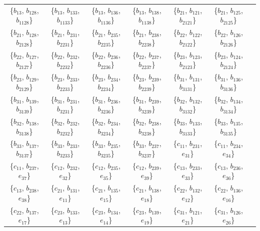 \documentclass[%
  reprint,
  superscriptaddress,
  showpacs,
  showkeys,
  amsmath,amssymb,
  pra,
  longbibliography,
  floatfix,
  x11names
]{revtex4-2}
\begin{document}
\begin{table}[htbp!]
\begin{ruledtabular}
\begin{tabular}{ccccccc}
\{$b_{13}$, $b_{128}$, $b_{1128}$\} & \{$b_{13}$, $b_{133}$, $b_{1133}$\} & \{$b_{13}$, $b_{136}$, $b_{1136}$\} & \{$b_{13}$, $b_{138}$, $b_{1138}$\} & \{$b_{21}$, $b_{121}$, $b_{2121}$\} & \{$b_{21}$, $b_{125}$, $b_{2125}$\} \\
\{$b_{21}$, $b_{128}$, $b_{2128}$\} & \{$b_{21}$, $b_{231}$, $b_{2231}$\} & \{$b_{21}$, $b_{235}$, $b_{2235}$\} & \{$b_{21}$, $b_{238}$, $b_{2238}$\} & \{$b_{22}$, $b_{122}$, $b_{2122}$\} & \{$b_{22}$, $b_{126}$, $b_{2126}$\} \\
\{$b_{22}$, $b_{127}$, $b_{2127}$\} & \{$b_{22}$, $b_{232}$, $b_{2232}$\} & \{$b_{22}$, $b_{236}$, $b_{2236}$\} & \{$b_{22}$, $b_{237}$, $b_{2237}$\} & \{$b_{23}$, $b_{123}$, $b_{2123}$\} & \{$b_{23}$, $b_{124}$, $b_{2124}$\} \\
\{$b_{23}$, $b_{129}$, $b_{2129}$\} & \{$b_{23}$, $b_{233}$, $b_{2233}$\} & \{$b_{23}$, $b_{234}$, $b_{2234}$\} & \{$b_{23}$, $b_{239}$, $b_{2239}$\} & \{$b_{31}$, $b_{131}$, $b_{3131}$\} & \{$b_{31}$, $b_{136}$, $b_{3136}$\} \\
\{$b_{31}$, $b_{139}$, $b_{3139}$\} & \{$b_{31}$, $b_{231}$, $b_{3231}$\} & \{$b_{31}$, $b_{236}$, $b_{3236}$\} & \{$b_{31}$, $b_{239}$, $b_{3239}$\} & \{$b_{32}$, $b_{132}$, $b_{3132}$\} & \{$b_{32}$, $b_{134}$, $b_{3134}$\} \\
\{$b_{32}$, $b_{138}$, $b_{3138}$\} & \{$b_{32}$, $b_{232}$, $b_{3232}$\} & \{$b_{32}$, $b_{234}$, $b_{3234}$\} & \{$b_{32}$, $b_{238}$, $b_{3238}$\} & \{$b_{33}$, $b_{133}$, $b_{3133}$\} & \{$b_{33}$, $b_{135}$, $b_{3135}$\} \\
\{$b_{33}$, $b_{137}$, $b_{3137}$\} & \{$b_{33}$, $b_{233}$, $b_{3233}$\} & \{$b_{33}$, $b_{235}$, $b_{3235}$\} & \{$b_{33}$, $b_{237}$, $b_{3237}$\} & \{$c_{11}$, $b_{231}$, $e_{31}$\} & \{$c_{11}$, $b_{234}$, $e_{34}$\} \\
\{$c_{11}$, $b_{237}$, $e_{37}$\} & \{$c_{12}$, $b_{232}$, $e_{32}$\} & \{$c_{12}$, $b_{235}$, $e_{35}$\} & \{$c_{12}$, $b_{239}$, $e_{39}$\} & \{$c_{13}$, $b_{233}$, $e_{33}$\} & \{$c_{13}$, $b_{236}$, $e_{36}$\} \\
\{$c_{13}$, $b_{238}$, $e_{38}$\} & \{$c_{21}$, $b_{131}$, $e_{11}$\} & \{$c_{21}$, $b_{135}$, $e_{15}$\} & \{$c_{21}$, $b_{138}$, $e_{18}$\} & \{$c_{22}$, $b_{132}$, $e_{12}$\} & \{$c_{22}$, $b_{136}$, $e_{16}$\} \\
\{$c_{22}$, $b_{137}$, $e_{17}$\} & \{$c_{23}$, $b_{133}$, $e_{13}$\} & \{$c_{23}$, $b_{134}$, $e_{14}$\} & \{$c_{23}$, $b_{139}$, $e_{19}$\} & \{$c_{31}$, $b_{121}$, $e_{21}$\} & \{$c_{31}$, $b_{126}$, $e_{26}$\} \\

\end{tabular}
\end{ruledtabular}
\end{table}
\end{document}
